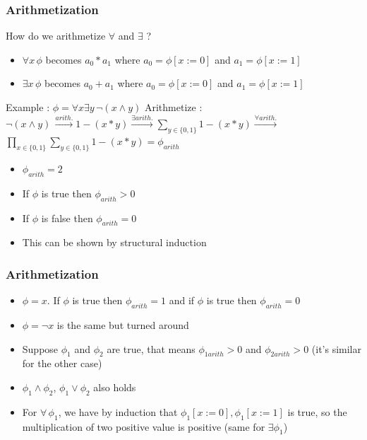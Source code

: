 \documentclass[hyperref={pdfpagelabels=false},t,10pt]{beamer}
\begin{document}
\begin{frame}
  \frametitle{Arithmetization}
  How do we arithmetize $\forall$ and $\exists$ ?  \newline
  \pause 

  \begin{itemize}
    \item $\forall x \, \phi$ becomes $a_0 * a_1$ where $a_0 = \phi[x := 0]$ and $a_1 = \phi[x := 1]$ 
    \pause
    \item $\exists x \, \phi$ becomes $a_0 + a_1$ where $a_0 = \phi[x := 0]$ and $a_1 = \phi[x := 1]$  
    \pause
  \end{itemize}
  Example : $\phi = \forall x \exists y \, \neg (x \land y)$ \newline \pause 
  Arithmetize : $\neg (x \land y) \, \xrightarrow{arith.} 1-(x * y) \xrightarrow{\exists arith.} \sum_{y \in \{0,1\}}^{} 1-(x*y) \xrightarrow{\forall arith.}$ \pause \newline 
  $\prod_{x \in \{0,1\}}^{} \sum_{y \in \{0,1\}} 1- (x*y) = \phi_{arith}$ \newline

  \begin{itemize}
    \item $\phi_{arith} = 2$ \pause
    \item If $\phi$ is true then $\phi_{arith} > 0$
    \item If $\phi$ is false then $\phi_{arith} = 0$ \pause
    \item This can be shown by structural induction 
  \end{itemize}
\end{frame}

\begin{frame}
  \frametitle{Arithmetization}
  \begin{itemize}
    \item $\phi = x$. If $\phi$ is true then $\phi_{arith} = 1$ and if $\phi $ is true then $\phi_{arith} = 0$
    \item $\phi = \neg x$ is the same but turned around \pause
    \item Suppose $\phi_1$ and $\phi_2$ are true, that means $\phi_{1arith} > 0$ and $\phi_{2arith} > 0$ \newline(it's similar for the other case)\pause
    \item $\phi_1 \land \phi_2$, $\phi_1 \lor \phi_2$ also holds
    \item For $\forall \, \phi_1$, we have by induction that $\phi_1[x := 0], \phi_1[x := 1]$ is true, so the multiplication of two positive value is positive (same for $\exists \phi_1$)
  \end{itemize}
\end{frame}
\end{document}
